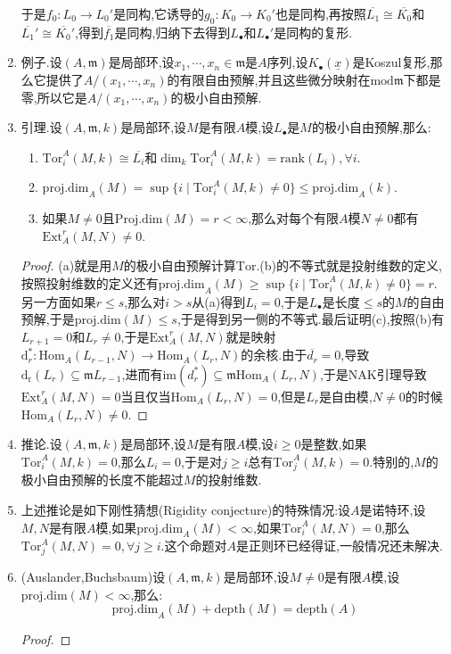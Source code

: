 \begin{enumerate}
	于是$f_0:L_0\to L_0'$是同构,它诱导的$g_0:K_0\to K_0'$也是同构,再按照$\overline{L_1}\cong\overline{K_0}$和$\overline{L_1}'\cong\overline{K_0}'$,得到$\overline{f_1}$是同构,归纳下去得到$L_{\bullet}$和$L_{\bullet}'$是同构的复形.
	\item 例子.设$(A,\mathfrak{m})$是局部环,设$x_1,\cdots,x_n\in\mathfrak{m}$是$A$序列,设$K_{\bullet}(\underline{x})$是Koszul复形,那么它提供了$A/(x_1,\cdots,x_n)$的有限自由预解,并且这些微分映射在$\mathrm{mod}\mathfrak{m}$下都是零,所以它是$A/(x_1,\cdots,x_n)$的极小自由预解.
	\item 引理.设$(A,\mathfrak{m},k)$是局部环,设$M$是有限$A$模,设$L_{\bullet}$是$M$的极小自由预解,那么:
	\begin{enumerate}
		\item $\mathrm{Tor}_i^A(M,k)\cong\overline{L_i}$和$\dim_k\mathrm{Tor}_i^A(M,k)=\mathrm{rank}(L_i),\forall i$.
		\item $\mathrm{proj.dim}_A(M)=\sup\{i\mid\mathrm{Tor}_i^A(M,k)\not=0\}\le\mathrm{proj.dim}_A(k)$.
		\item 如果$M\not=0$且$\mathrm{Proj.dim}(M)=r<\infty$,那么对每个有限$A$模$N\not=0$都有$\mathrm{Ext}_A^r(M,N)\not=0$.
	\end{enumerate}
    \begin{proof}
    	
    	(a)就是用$M$的极小自由预解计算$\mathrm{Tor}$.(b)的不等式就是投射维数的定义,按照投射维数的定义还有$\mathrm{proj.dim}_A(M)\ge\sup\{i\mid\mathrm{Tor}_i^A(M,k)\not=0\}=r$.另一方面如果$r\le s$,那么对$i>s$从(a)得到$L_i=0$,于是$L_{\bullet}$是长度$\le s$的$M$的自由预解,于是$\mathrm{proj.dim}(M)\le s$,于是得到另一侧的不等式.最后证明(c),按照(b)有$L_{r+1}=0$和$L_r\not=0$,于是$\mathrm{Ext}_A^r(M,N)$就是映射$\mathrm{d}_r^*:\mathrm{Hom}_A(L_{r-1},N)\to\mathrm{Hom}_A(L_r,N)$的余核.由于$\overline{d_r}=0$,导致$\mathrm{d_r}(L_r)\subseteq\mathfrak{m}L_{r-1}$,进而有$\mathrm{im}(d_r^*)\subseteq\mathfrak{m}\mathrm{Hom}_A(L_r,N)$,于是NAK引理导致$\mathrm{Ext}_A^r(M,N)=0$当且仅当$\mathrm{Hom}_A(L_r,N)=0$,但是$L_r$是自由模,$N\not=0$的时候$\mathrm{Hom}_A(L_r,N)\not=0$.
    \end{proof}
    \item 推论.设$(A,\mathfrak{m},k)$是局部环,设$M$是有限$A$模,设$i\ge0$是整数,如果$\mathrm{Tor}_i^A(M,k)=0$,那么$L_i=0$,于是对$j\ge i$总有$\mathrm{Tor}_j^A(M,k)=0$.特别的,$M$的极小自由预解的长度不能超过$M$的投射维数.
    \item 上述推论是如下刚性猜想(Rigidity conjecture)的特殊情况:设$A$是诺特环,设$M,N$是有限$A$模,如果$\mathrm{proj.dim}_A(M)<\infty$,如果$\mathrm{Tor}_i^A(M,N)=0$,那么$\mathrm{Tor}_j^A(M,N)=0,\forall j\ge i$.这个命题对$A$是正则环已经得证,一般情况还未解决.
    \item (Auslander,Buchsbaum)设$(A,\mathfrak{m},k)$是局部环,设$M\not=0$是有限$A$模,设$\mathrm{proj.dim}(M)<\infty$,那么:
    $$\mathrm{proj.dim}_A(M)+\mathrm{depth}(M)=\mathrm{depth}(A)$$
    \begin{proof}
    	

\end{proof}
\end{enumerate}
